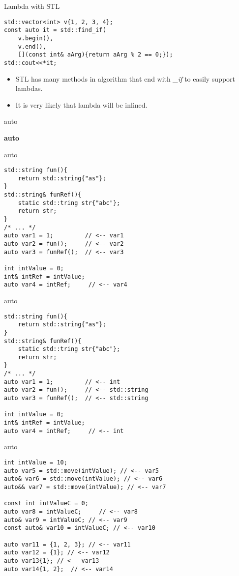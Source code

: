 \documentclass{beamer}
\begin{document}
\begin{frame}[fragile]{Lambda with STL}

\begin{lstlisting}[style=customcpp]
std::vector<int> v{1, 2, 3, 4};
const auto it = std::find_if(
	v.begin(), 
	v.end(), 
	[](const int& aArg){return aArg % 2 == 0;});
std::cout<<*it;
\end{lstlisting}
\begin{itemize}
\item STL has many methods in algorithm that end with \textit{\_if} to easily support lambdas.
\item It is very likely that lambda will be inlined.
\end{itemize}
\end{frame}

\begin{frame}[fragile]{auto}
\begin{center}
{\Huge \textbf{auto}}
\end{center}
\end{frame}

\begin{frame}[fragile]{auto}
\begin{lstlisting}[style=customcpp]
std::string fun(){
	return std::string{"as"};
}
std::string& funRef(){
	static std::tring str{"abc"};
	return str;
}
/* ... */
auto var1 = 1;         // <-- var1
auto var2 = fun();     // <-- var2
auto var3 = funRef();  // <-- var3
	
int intValue = 0;
int& intRef = intValue;
auto var4 = intRef;     // <-- var4
\end{lstlisting}
\end{frame}

\begin{frame}[fragile]{auto}
\begin{lstlisting}[style=customcpp]
std::string fun(){
	return std::string{"as"};
}
std::string& funRef(){
	static std::tring str{"abc"};
	return str;
}
/* ... */
auto var1 = 1;         // <-- int
auto var2 = fun();     // <-- std::string
auto var3 = funRef();  // <-- std::string
	
int intValue = 0;
int& intRef = intValue;
auto var4 = intRef;     // <-- int
\end{lstlisting}
\end{frame}

\begin{frame}[fragile]{auto}
\begin{lstlisting}[style=customcpp]
int intValue = 10;
auto var5 = std::move(intValue); // <-- var5
auto& var6 = std::move(intValue); // <-- var6
auto&& var7 = std::move(intValue); // <-- var7

const int intValueC = 0;
auto var8 = intValueC;     // <-- var8
auto& var9 = intValueC; // <-- var9
const auto& var10 = intValueC; // <-- var10

auto var11 = {1, 2, 3}; // <-- var11   
auto var12 = {1}; // <-- var12
auto var13{1}; // <-- var13
auto var14{1, 2};  // <-- var14
\end{lstlisting}
\end{frame}
\end{document}
